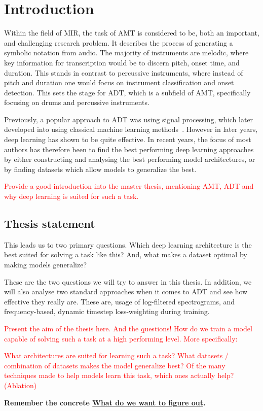 \chapter{Introduction}

Within the field of \gls{MIR}, the task of \gls{AMT} is considered to be, both an important, and challenging research problem. It describes the process of generating a symbolic notation from audio. The majority of instruments are melodic, where key information for transcription would be to discern pitch, onset time, and duration. This stands in contrast to percussive instruments, where instead of pitch and duration one would focus on instrument classification and onset detection. This sets the stage for \gls{ADT}, which is a subfield of \gls{AMT}, specifically focusing on drums and percussive instruments.~\cite{8350302}

Previously, a popular approach to \gls{ADT} was using signal processing, which later developed into using classical machine learning methods~\cite{8350302}. However in later years, deep learning has shown to be quite effective. In recent years, the focus of most authors has therefore been to find the best performing deep learning approaches by either constructing and analysing the best performing model architectures, or by finding datasets which allow models to generalize the best.~\cite{signals4040042}

\textcolor{red}{Provide a good introduction into the master thesis, mentioning \gls{AMT}, \gls{ADT} and why deep learning is suited for such a task.}

\section{Thesis statement}

This leads us to two primary questions. Which deep learning architecture is the best suited for solving a task like this? And, what makes a dataset optimal by making models generalize?

These are the two questions we will try to answer in this thesis. In addition, we will also analyse two standard approaches when it comes to \gls{ADT} and see how effective they really are. These are, usage of log-filtered spectrograms, and frequency-based, dynamic timestep loss-weighting during training. 

\textcolor{red}{
    Present the aim of the thesis here. And the \b{questions!}
How do we train a model capable of solving such a task at a high performing level. More specifically:
}


\textcolor{red}{
What architectures are suited for learning such a task?
What datasets / combination of datasets makes the model generalize best?
Of the many techniques made to help models learn this task, which ones actually help? (Ablation)
}

\textbf{Remember the concrete \underline{What do we want to figure out}.}